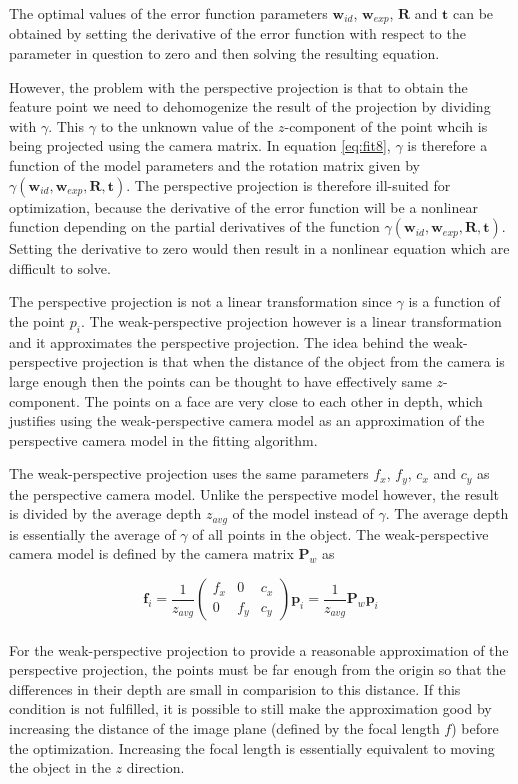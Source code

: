 \documentclass[11pt,a4paper]{report}
\begin{document}
The optimal values of the error function parameters $\mathbf{w}_{id}$, $\mathbf{w}_{exp}$,
$\mathbf{R}$ and $\mathbf{t}$ can be obtained by setting the derivative of the
error function with respect to the parameter in question to zero and then
solving the resulting equation.


However, the problem with the perspective projection is that to obtain the feature point
we need to dehomogenize the result of the projection by dividing with
$\gamma$. This $\gamma$ to the unknown value of the $z$-component of the point
whcih is being projected using the camera matrix. In equation \ref{eq:fit8}, $\gamma$ is therefore a function of the model parameters and the rotation
matrix given by $\gamma(\mathbf{w}_{id},\mathbf{w}_{exp},\mathbf{R},\mathbf{t})$. The
  perspective projection is therefore ill-suited for optimization, because the derivative of the error function will be
a nonlinear function depending on the partial derivatives of the function
$\gamma(\mathbf{w}_{id},\mathbf{w}_{exp},\mathbf{R},\mathbf{t})$. Setting the derivative to
  zero would then result in a nonlinear equation which are difficult to solve.

The perspective projection is not a linear transformation since $\gamma$ is a
function of the point $p_i$. The weak-perspective projection however is a linear
transformation and it approximates the perspective projection. The idea
behind the weak-perspective projection is that when the distance of the object
from the camera is large enough then the points can be thought to have effectively same
$z$-component. The points on a face are very close to each other in depth, which justifies using the weak-perspective camera model as an approximation
of the perspective camera model in the fitting algorithm. 

The weak-perspective projection uses the same parameters $f_x$, $f_y$, $c_x$ and
$c_y$ as the perspective camera model. Unlike the perspective model however, the
result is divided by the average depth $z_{avg}$ of the model instead of
$\gamma$. The average depth is essentially the average of $\gamma$ of all points
in the object. The weak-perspective camera model is defined by the camera matrix
$\mathbf{P}_w$ as 

\begin{equation}\label{eq:fit9}
 \mathbf{f}_i = \frac{1}{z_{avg}}\begin{pmatrix}f_x&0&c_x\\0&f_y&c_y\end{pmatrix}\mathbf{p}_i
    = \frac{1}{z_{avg}}\mathbf{P}_w\mathbf{p}_i
\end{equation}\\
For the weak-perspective projection to provide a reasonable approximation of the
perspective projection, the points must be far enough from the origin so that
the differences in their depth are small in comparision to this distance. If this condition is not fulfilled, it is
possible to still make the approximation good by increasing the distance of the
image plane (defined by the focal length $f$) before the optimization. Increasing the focal length
is essentially equivalent to moving the object in the $z$ direction.
\end{document}
